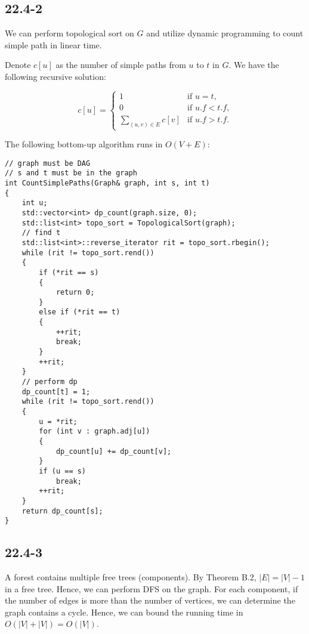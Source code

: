 \subsection*{22.4-2}

We can perform topological sort on $G$
and utilize dynamic programming to count simple path in linear time.

Denote $c[u]$ as the number of simple paths from $u$ to $t$ in $G$.
We have the following recursive solution:

\begin{equation*}
    c[u] = 
    \begin{cases}
        1 & \text{if $u = t$,} \\
        0 & \text{if $u.f < t.f$,} \\
        \sum\limits_{(u,v) \in E} c[v] & \text{if $u.f > t.f$.}
    \end{cases}
\end{equation*}

The following bottom-up algorithm runs in $O(V + E)$:

\begin{verbatim}
// graph must be DAG
// s and t must be in the graph
int CountSimplePaths(Graph& graph, int s, int t)
{
    int u;
    std::vector<int> dp_count(graph.size, 0);
    std::list<int> topo_sort = TopologicalSort(graph);
    // find t
    std::list<int>::reverse_iterator rit = topo_sort.rbegin();
    while (rit != topo_sort.rend())
    {
        if (*rit == s)
        {
            return 0;
        }
        else if (*rit == t)
        {
            ++rit;
            break;
        }
        ++rit;
    }
    // perform dp
    dp_count[t] = 1;
    while (rit != topo_sort.rend())
    {
        u = *rit;
        for (int v : graph.adj[u])
        {
            dp_count[u] += dp_count[v];
        }
        if (u == s)
            break;
        ++rit;
    }
    return dp_count[s];
}
\end{verbatim}

\subsection*{22.4-3}

A forest contains multiple free trees (components).
By Theorem B.2, $|E| = |V| - 1$ in a free tree.
Hence, we can perform DFS on the graph.
For each component,
if the number of edges is more than the number of vertices,
we can determine the graph contains a cycle.
Hence, we can bound the running time in $O(|V| + |V|) = O(|V|)$.

